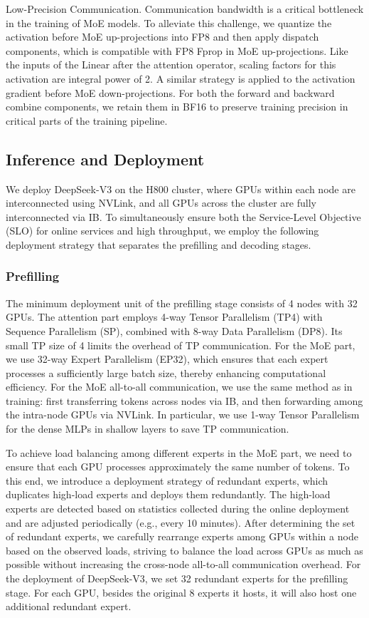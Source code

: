 \documentclass[11pt,a4paper]{article}
\begin{document}
Low-Precision Communication.
Communication bandwidth is a critical bottleneck in the training of MoE models. 
To alleviate this challenge, we quantize the activation before MoE up-projections into FP8 and then apply dispatch components, which is compatible with FP8 Fprop in MoE up-projections. Like the inputs of the Linear after the attention operator, scaling factors for this activation are integral power of 2.
A similar strategy is applied to the activation gradient before MoE down-projections. 
For both the forward and backward combine components, we retain them in BF16 to preserve training precision in critical parts of the training pipeline.

\subsection{Inference and Deployment}

We deploy DeepSeek-V3 on the H800 cluster, where GPUs within each node are interconnected using NVLink, and all GPUs across the cluster are fully interconnected via IB. 
To simultaneously ensure both the Service-Level Objective (SLO) for online services and high throughput, we employ the following deployment strategy that separates the prefilling and decoding stages.

\subsubsection{Prefilling}

The minimum deployment unit of the prefilling stage consists of 4 nodes with 32 GPUs. 
The attention part employs 4-way Tensor Parallelism (TP4) with Sequence Parallelism (SP), combined with 8-way Data Parallelism (DP8).
Its small TP size of 4 limits the overhead of TP communication. 
For the MoE part, we use 32-way Expert Parallelism (EP32), which ensures that each expert processes a sufficiently large batch size, thereby enhancing computational efficiency. 
For the MoE all-to-all communication, we use the same method as in training: first transferring tokens across nodes via IB, and then forwarding among the intra-node GPUs via NVLink. 
In particular, we use 1-way Tensor Parallelism for the dense MLPs in shallow layers to save TP communication.

To achieve load balancing among different experts in the MoE part, we need to ensure that each GPU processes approximately the same number of tokens.  
To this end, we introduce a deployment strategy of redundant experts, which duplicates high-load experts and deploys them redundantly. 
The high-load experts are detected based on statistics collected during the online deployment and are adjusted periodically (e.g., every 10 minutes). 
After determining the set of redundant experts, we carefully rearrange experts among GPUs within a node based on the observed loads, striving to balance the load across GPUs as much as possible without increasing the cross-node all-to-all communication overhead. 
For the deployment of DeepSeek-V3, we set 32 redundant experts for the prefilling stage. 
For each GPU, besides the original 8 experts it hosts, it will also host one additional redundant expert.
\end{document}
